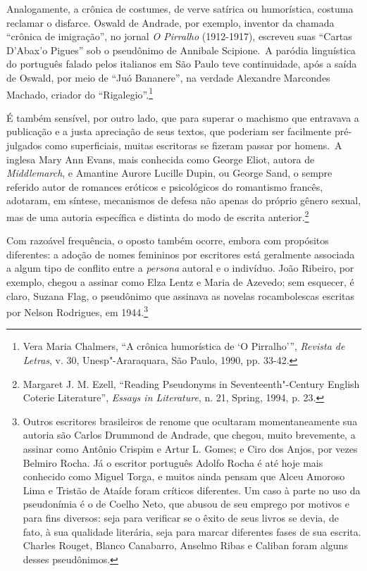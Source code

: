 Analogamente, a crônica de costumes, de verve satírica ou humorística,
costuma reclamar o disfarce. Oswald de Andrade, por exemplo, inventor da
chamada ``crônica de imigração'', no jornal \emph{O Pirralho}
(1912-1917), escreveu suas ``Cartas D'Abax'o Pigues'' sob o pseudônimo
de Annibale Scipione.~A paródia linguística do português falado pelos
italianos em São Paulo teve continuidade, após a saída de Oswald, por
meio de ``Juó Bananere'', na verdade Alexandre Marcondes Machado,
criador do ``Rigalegio''.\footnote{Vera Maria Chalmers, ``A crônica
  humorística de `O Pirralho''', \emph{Revista de Letras}, v. 30,
  Unesp"-Araraquara, São Paulo, 1990, pp. 33-42.}

É também sensível, por outro lado, que para superar o machismo que
entravava a publicação e a justa apreciação de seus textos, que poderiam
ser facilmente pré-julgados como superficiais, muitas escritoras se
fizeram passar por homens.~A inglesa Mary Ann Evans, mais conhecida como
George Eliot, autora de \emph{Middlemarch}, e Amantine Aurore Lucille
Dupin, ou George Sand, o sempre referido autor de romances eróticos e
psicológicos do romantismo francês, adotaram, em síntese, mecanismos de
defesa não apenas do próprio gênero sexual, mas de uma autoria
específica e distinta do modo de escrita anterior.\footnote{Margaret J.
  M. Ezell, ``Reading Pseudonyms in Seventeenth"-Century English Coterie
  Literature'', \emph{Essays in Literature}, n. 21, Spring, 1994, p. 23.}

Com razoável frequência, o oposto também ocorre, embora com propósitos
diferentes: a adoção de nomes femininos por escritores está geralmente
associada a algum tipo de conflito entre a \emph{persona} autoral e o
indivíduo. João Ribeiro, por exemplo, chegou a assinar como Elza Lentz e
Maria de Azevedo; sem esquecer, é claro, Suzana Flag, o pseudônimo que
assinava as novelas rocambolescas escritas por Nelson Rodrigues, em
1944.\footnote{Outros escritores brasileiros de renome que ocultaram
  momentaneamente sua autoria são Carlos Drummond de Andrade, que
  chegou, muito brevemente, a assinar como Antônio Crispim e Artur L.
  Gomes; e Ciro dos Anjos, por vezes Belmiro Rocha. Já o escritor
  português Adolfo Rocha é até hoje mais conhecido como Miguel Torga, e
  muitos ainda pensam que Alceu Amoroso Lima e Tristão de Ataíde foram
  críticos diferentes. Um caso à parte no uso da pseudonímia é o de
  Coelho Neto, que abusou de seu emprego por motivos e para fins
  diversos: seja para verificar se o êxito de seus livros se devia, de
  fato, à sua qualidade literária, seja para marcar diferentes fases de
  sua escrita. Charles Rouget, Blanco Canabarro, Anselmo Ribas e Caliban
  foram alguns desses pseudônimos.}


